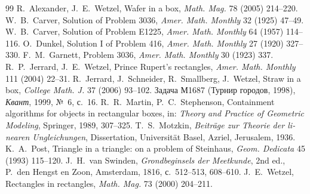\documentclass[11pt]{article}
\theoremstyle{definition}
\theoremstyle{remark}
\begin{document}
\begin{thebibliography}{99}
 R.~Alexander, J.~E.~Wetzel, Wafer in a box, \emph{Math. Mag.} 78 (2005) 214--220.
 W.~B.~Carver, Solution of Problem 3036, \emph{Amer. Math. Monthly} 32 (1925) 47--49.
 W.~B.~Carver, Solution of Problem E1225, \emph{Amer. Math. Monthly} 64 (1957) 114--116.
 O.~Dunkel, Solution I of Problem 416, \emph{Amer. Math. Monthly} 27 (1920) 327--330.
 F.~M.~Garnett, Problem 3036, \emph{Amer. Math. Monthly} 30 (1923) 337.
 R.~P.~Jerrard, J.~E.~Wetzel, Prince Rupert's rectangles, \emph{Amer. Math. Monthly} 111 (2004) 22--31.
 R.~Jerrard, J.~Schneider, R.~Smallberg, J.~Wetzel, Straw in a box, \emph{College Math. J.} 37 (2006) 93--102.
 Задача М1687 (Турнир городов, 1998), \emph{Квант}, 1999, №~6, с.~16.
 R.~R.~Martin, P.~C.~Stephenson, Containment algorithms for objects in rectangular boxes, in: \emph{Theory and Practice of Geometric Modeling}, Springer, 1989, 307--325.
 T.~S.~Motzkin, \textlatin{\emph{Beitr\"age zur Theorie der linearen Ungleichungen}, Dissertation, Universit\"at Basel}, Azriel, Jerusalem, 1936.
 K.~A.~Post, Triangle in a triangle: on a problem of Steinhaus, \emph{Geom. Dedicata} 45 (1993) 115--120.
 J.~H.~van Swinden, \emph{Grondbeginsels der Meetkunde}, 2nd ed., P.~den Hengst en Zoon, Amsterdam, 1816, с.~512--513, 608--610.
 J.~E.~Wetzel, Rectangles in rectangles, \emph{Math. Mag.} 73 (2000) 204--211.
\end{thebibliography}
\end{document}

